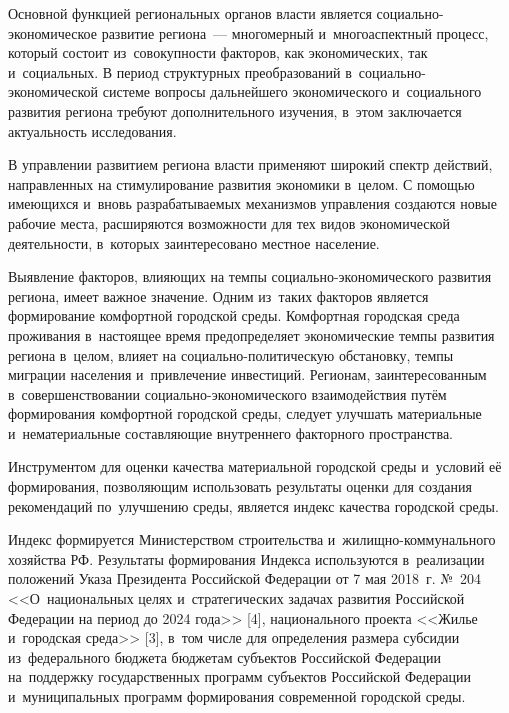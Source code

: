 



\makeProcTitle
{}

Основной функцией региональных органов власти является социально-экономическое развитие региона~--- многомерный и~многоаспектный процесс, который состоит из~совокупности факторов, как экономических, так и~социальных. В период структурных преобразований в~социально-экономической системе вопросы дальнейшего экономического и~социального развития региона требуют дополнительного изучения, в~этом заключается актуальность исследования.

В управлении развитием региона власти применяют широкий спектр действий, направленных на стимулирование развития экономики в~целом. С помощью имеющихся и~вновь разрабатываемых механизмов управления создаются новые рабочие места, расширяются возможности для тех видов экономической деятельности, в~которых заинтересовано местное население.

Выявление факторов, влияющих на темпы социально-экономического развития региона, имеет важное значение. Одним из~таких факторов является формирование комфортной городской среды. Комфортная городская среда проживания в~настоящее время предопределяет экономические темпы развития региона в~целом, влияет на социально-политическую обстановку, темпы миграции населения и~привлечение инвестиций. Регионам, заинтересованным в~совершенствовании социально-экономического взаимодействия путём формирования комфортной городской среды, следует улучшать материальные и~нематериальные составляющие внутреннего факторного пространства.

Инструментом для оценки качества материальной городской среды и~ус\-ло\-вий её формирования, позволяющим использовать результаты оценки для создания рекомендаций по~улучшению среды, является индекс качества городской среды.

Индекс формируется Министерством строительства и жилищно-ком\-му\-наль\-но\-го хозяйства РФ. Результаты формирования Индекса используются в реализации положений Указа Президента Российской Федерации от 7 мая 2018~г. №~204 <<О национальных целях и стратегических задачах развития Российской Федерации на период до 2024 года>> [4], национального проекта <<Жилье и городская среда>> [3], в том числе для определения размера субсидии из~федерального бюджета бюджетам субъектов Российской Федерации на~поддержку государственных программ субъектов Российской Федерации и~муниципальных программ формирования современной городской среды.

